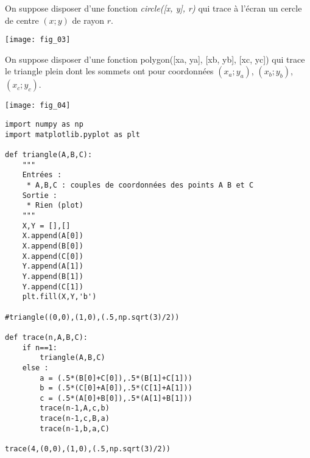 \begin{multicols}{2}
\exer{}
\setcounter{numques}{0}

On suppose disposer d’une fonction \textsl{circle([x, y], r)} qui trace à l’écran un cercle de centre
$(x;y)$ de rayon $r$. 


\begin{center}
\texttt{[image: fig\_03]}
\end{center}


\exer{}
\setcounter{numques}{0}

On suppose disposer d’une fonction \textsf{polygon([xa, ya], [xb, yb], [xc, yc])} qui trace le
triangle plein dont les sommets ont pour coordonnées $(x_a;y_a)$, $(x_b;y_b)$, $(x_c;y_c)$. 


\begin{center}
\texttt{[image: fig\_04]}
\end{center}

\ifprof
\begin{corrige}
\begin{lstlisting}
import numpy as np
import matplotlib.pyplot as plt

def triangle(A,B,C):
    """
    Entrées :
     * A,B,C : couples de coordonnées des points A B et C
    Sortie : 
     * Rien (plot) 
    """
    X,Y = [],[]
    X.append(A[0])
    X.append(B[0])
    X.append(C[0])
    Y.append(A[1])
    Y.append(B[1])
    Y.append(C[1])
    plt.fill(X,Y,'b')

#triangle((0,0),(1,0),(.5,np.sqrt(3)/2))

def trace(n,A,B,C):
    if n==1:
        triangle(A,B,C)
    else :
        a = (.5*(B[0]+C[0]),.5*(B[1]+C[1]))
        b = (.5*(C[0]+A[0]),.5*(C[1]+A[1]))
        c = (.5*(A[0]+B[0]),.5*(A[1]+B[1]))
        trace(n-1,A,c,b)
        trace(n-1,c,B,a)
        trace(n-1,b,a,C)
        
trace(4,(0,0),(1,0),(.5,np.sqrt(3)/2))        
\end{lstlisting}
\end{corrige}
\else
\fi




\end{multicols}
